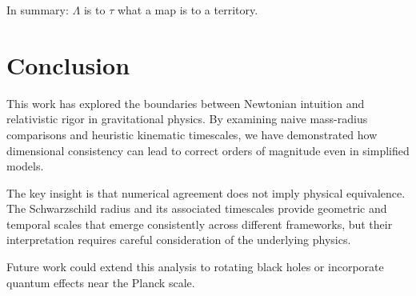 \documentclass[12pt,a4paper]{article}
\begin{document}
In summary: $\Lambda$ is to $\tau$ what a map is to a territory.

\section{Conclusion}

This work has explored the boundaries between Newtonian intuition and relativistic rigor in gravitational physics. By examining naive mass-radius comparisons and heuristic kinematic timescales, we have demonstrated how dimensional consistency can lead to correct orders of magnitude even in simplified models.

The key insight is that numerical agreement does not imply physical equivalence. The Schwarzschild radius and its associated timescales provide geometric and temporal scales that emerge consistently across different frameworks, but their interpretation requires careful consideration of the underlying physics.

Future work could extend this analysis to rotating black holes or incorporate quantum effects near the Planck scale.



\end{document}
